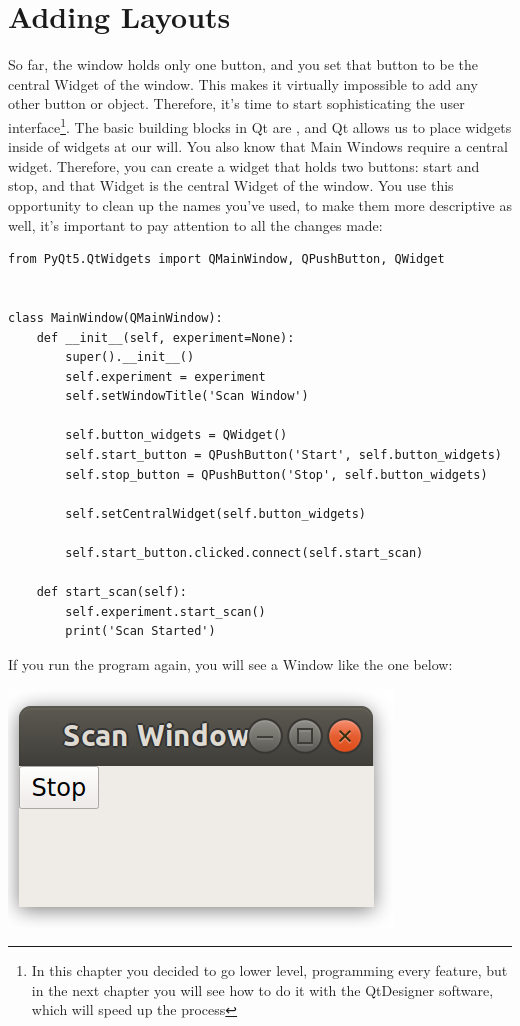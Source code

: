 \section{Adding Layouts}\label{sec:adding-layouts}
So far, the window holds only one button, and you set that button to be the central Widget of the window. This makes it virtually impossible to add any other button or object. Therefore, it's time to start sophisticating the user interface\footnote{In this chapter you decided to go lower level, programming every feature, but in the next chapter you will see how to do it with the QtDesigner software, which will speed up the process}. The basic building blocks in Qt are , and Qt allows us to place widgets inside of widgets at our will. You also know that Main Windows require a central widget. Therefore, you can create a widget that holds two buttons: start and stop, and that Widget is the central Widget of the window. You use this opportunity to clean up the names you've used, to make them more descriptive as well, it's important to pay attention to all the changes made:

\begin{verbatim}
from PyQt5.QtWidgets import QMainWindow, QPushButton, QWidget


class MainWindow(QMainWindow):
    def __init__(self, experiment=None):
        super().__init__()
        self.experiment = experiment
        self.setWindowTitle('Scan Window')

        self.button_widgets = QWidget()
        self.start_button = QPushButton('Start', self.button_widgets)
        self.stop_button = QPushButton('Stop', self.button_widgets)

        self.setCentralWidget(self.button_widgets)

        self.start_button.clicked.connect(self.start_scan)

    def start_scan(self):
        self.experiment.start_scan()
        print('Scan Started')
\end{verbatim}

If you run the program again, you will see a Window like the one below:

\begin{center}
    \includegraphics[width=.3\textwidth]{images/Chapter_08/05_window_without_layout.png}
\end{center}

